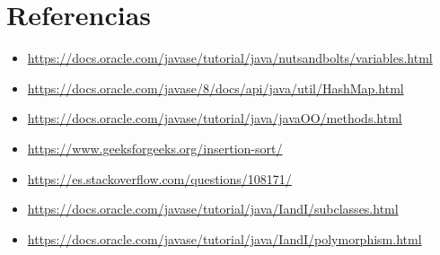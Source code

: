 \documentclass{article}
\begin{document}

\section{Referencias}
\begin{itemize}			
    \item \url{https://docs.oracle.com/javase/tutorial/java/nutsandbolts/variables.html}
    \item \url{https://docs.oracle.com/javase/8/docs/api/java/util/HashMap.html}
    \item \url{https://docs.oracle.com/javase/tutorial/java/javaOO/methods.html}
    \item \url{https://www.geeksforgeeks.org/insertion-sort/}
    \item \url{https://es.stackoverflow.com/questions/108171/}
    \item \url{https://docs.oracle.com/javase/tutorial/java/IandI/subclasses.html}
    \item \url{https://docs.oracle.com/javase/tutorial/java/IandI/polymorphism.html}
\end{itemize}	
	
%
%
%
\end{document}
